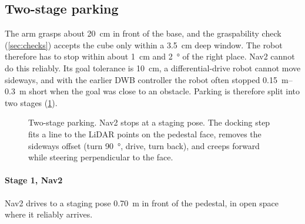 \documentclass[journal]{IEEEtran}
\begin{document}
\subsection{Two-stage parking}
\label{sec:parking}
The arm grasps about \SI{20}{cm} in front of the base, and the graspability check (\cref{sec:checks}) accepts the cube only within a \SI{3.5}{cm} deep window. The robot therefore has to stop within about \SI{1}{cm} and \SI{2}{\degree} of the right place. Nav2 cannot do this reliably. Its goal tolerance is \SI{10}{cm}, a differential-drive robot cannot move sideways, and with the earlier DWB controller the robot often stopped \SIrange{0.15}{0.3}{m} short when the goal was close to an obstacle. Parking is therefore split into two stages (\cref{fig:dock}).

\begin{figure}[t]
\centering
{}
\caption{Two-stage parking. Nav2 stops at a staging pose. The docking step fits a line to the LiDAR points on the pedestal face, removes the sideways offset (turn \SI{90}{\degree}, drive, turn back), and creeps forward while steering perpendicular to the face.}
\label{fig:dock}
\end{figure}

\paragraph*{Stage 1, Nav2} Nav2 drives to a staging pose \SI{0.70}{m} in front of the pedestal, in open space where it reliably arrives.
\end{document}
